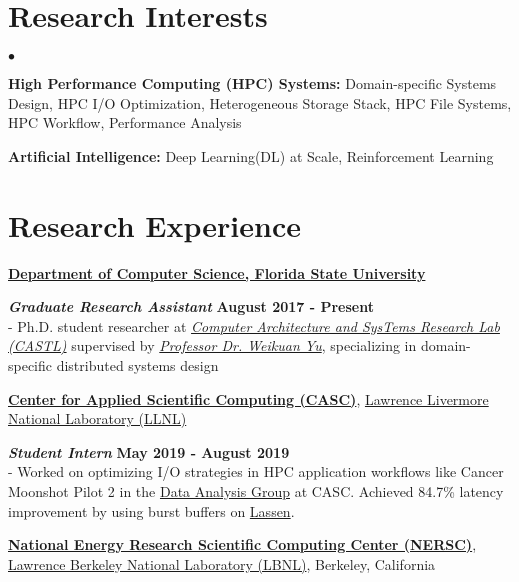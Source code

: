\documentclass[margin,line]{res}
\newenvironment{list2}{
  \begin{list}{$\bullet$}{%
      \setlength{\itemsep}{0in}
      \setlength{\parsep}{0in} \setlength{\parskip}{0in}
      \setlength{\topsep}{0in} \setlength{\partopsep}{0in} 
      \setlength{\leftmargin}{0.2in}}}{\end{list}}
\begin{document}
\begin{resume}
\section{\sc Research Interests}
\begin{list2}
\item \textbf{High Performance Computing (HPC) Systems:} Domain-specific Systems Design, HPC I/O Optimization, Heterogeneous Storage Stack, HPC File Systems, HPC Workflow, Performance Analysis
\item \textbf{Artificial Intelligence:} Deep Learning(DL) at Scale, Reinforcement Learning
\end{list2}

\vspace*{-.05in}

\section{\sc Research Experience}
{\bf \href{http://www.cs.fsu.edu/}{Department of Computer Science, Florida State University}}

\vspace{-.4cm}
\textbf{{\em Graduate Research Assistant}} \hfill {\bf August 2017 - Present}\\
- Ph.D. student researcher at \textit{\href{http://castl.cs.fsu.edu/doku.php/}{Computer Architecture and SysTems Research Lab (CASTL)}} supervised by \textit{\href{https://www.cs.fsu.edu/~yuw/}{Professor Dr. Weikuan Yu}}, specializing in domain-specific distributed systems design

\vspace{-.25cm}
{\bf \href{https://computing.llnl.gov/casc}{Center for Applied Scientific Computing (CASC)}}, \href{http://www.llnl.gov/}{Lawrence Livermore National Laboratory (LLNL)}

\vspace{-.4cm}
\textbf{{\em Student Intern}} \hfill {\bf May 2019 - August 2019}\\
- Worked on optimizing I/O strategies in HPC application workflows like Cancer Moonshot Pilot 2 in the \href{https://computing.llnl.gov/casc/data-analysis-group}{Data Analysis Group} at CASC. Achieved 84.7\% latency improvement by using burst buffers on \href{https://hpc.llnl.gov/hardware/platforms/lassen}{Lassen}.

\vspace{-.25cm}
{\bf \href{http://www.nersc.gov/}{National Energy Research Scientific Computing Center (NERSC)}}, \href{http://www.lbl.gov/}{Lawrence Berkeley National Laboratory (LBNL)}, Berkeley, California


\end{resume}
\end{document}
